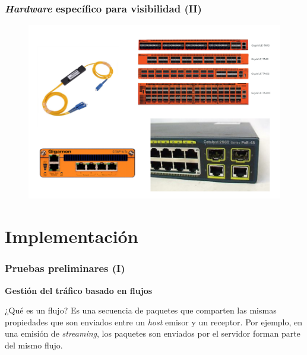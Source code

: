 \documentclass{beamer}
\begin{document}
\begin{frame}
\frametitle{\textit{Hardware} específico para visibilidad (II)}

\begin{figure}[H]
	\centering
	\includegraphics[scale=0.7]{hardware.png}
	\label{hardware}
\end{figure}

\end{frame}

\section{Implementación}


\begin{frame}
\frametitle{Pruebas preliminares (I)}

\textbf{Gestión del tráfico basado en flujos}

\begin{block}{¿Qué es un flujo?}
	Es una secuencia de paquetes que comparten las mismas propiedades que son enviados entre un \textit{host} emisor y un receptor. Por ejemplo, en una emisión de \textit{streaming}, los paquetes son enviados por el servidor forman parte del mismo flujo. 
\end{block}

\end{frame}
\end{document}
